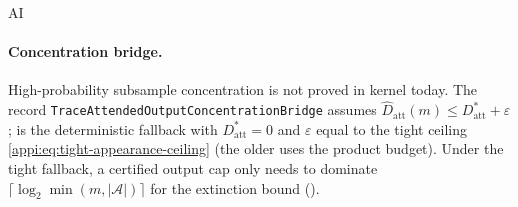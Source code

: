 \begin{authbar}{AI}
\paragraph{Concentration bridge.}
High-probability subsample concentration is not proved in kernel today.
The record \texttt{TraceAttendedOutputConcentrationBridge} assumes \(\widehat D_{\mathrm{att}}(m)\leq D^\ast_{\mathrm{att}}+\varepsilon\);  is the deterministic fallback with \(D^\ast_{\mathrm{att}}=0\) and \(\varepsilon\) equal to the tight ceiling \eqref{appi:eq:tight-appearance-ceiling} (the older  uses the product budget).
Under the tight fallback, a certified output cap only needs to dominate \(\lceil\log_2\min(m,|{\mathcal A}|)\rceil\) for the extinction bound ().


\end{authbar}
